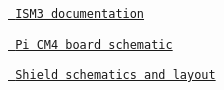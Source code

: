 \href{RM1S3 Host Commands.pdf}{\texttt{ ISM3 documentation}}

\href{schema_cm4.PDF}{\texttt{ Pi CM4 board schematic}}

\href{RFShield_docs.PDF}{\texttt{ Shield schematics and layout}} 